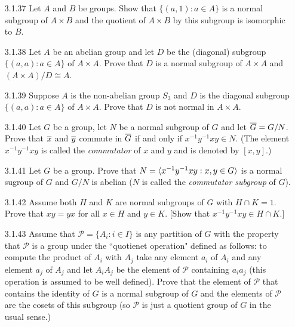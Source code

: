\begin{enumerate}
   \item[3.1.37]  Let $A$ and $B$ be groups. Show that $\{(a, 1) : a \in A\}$ is
                  a normal subgroup of $A \times B$ and the quotient of
                  $A \times B$ by this subgroup is isomorphic to $B$.
   \item[3.1.38]  Let $A$ be an abelian group and let $D$ be the (diagonal)
                  subgroup $\{(a, a) : a \in A\}$ of $A \times A$. Prove that
                  $D$ is a normal subgroup of $A \times A$ and
                  $(A \times A)/D \cong A$.
   \item[3.1.39]  Suppose $A$ is the non-abelian group $S_3$ and $D$ is the
                  diagonal subgroup $\{(a, a) : a \in A\}$ of $A \times A$.
                  Prove that $D$ is not normal in $A \times A$.
   \item[3.1.40]  Let $G$ be a group, let $N$ be a normal subgroup of $G$ and
                  let $\overline{G} = G/N$. Prove that $\overline{x}$ and $\overline{y}$ commute in
                  $\overline{G}$ if and only if $x^{-1}y^{-1}xy \in N$. (The element
                  $x^{-1}y^{-1}xy$ is called the \textit{commutator} of $x$ and
                  $y$ and is denoted by $[x, y]$.)
   \item[3.1.41]  Let $G$ be a group. Prove that
                  $N = \langle x^{-1}y^{-1}xy : x, y \in G \rangle$ is a normal sugroup of
                  $G$ and $G/N$ is abelian ($N$ is called the
                  \textit{commutator subgroup} of $G$).
   \item[3.1.42]  Assume both $H$ and $K$ are normal subgroups of $G$ with
                  $H \cap K = 1$. Prove that $xy = yx$ for all $x \in H$ and
                  $y \in K$. [Show that $x^{-1}y^{-1}xy \in H \cap K$.]
   \item[3.1.43]  Assume that $\mathcal{P} = \{A_i : i \in I\}$ is any partition
                  of $G$ with the property that $\mathcal{P}$ is a group under
                  the ``quotienet operation" defined as follows: to compute the
                  product of $A_i$ with $A_j$ take any element $a_i$ of $A_i$
                  and any element $a_j$ of $A_j$ and let $A_iA_j$ be the element
                  of $\mathcal{P}$ containing $a_ia_j$ (this operation is
                  assumed to be well defined). Prove that the element of
                  $\mathcal{P}$ that contains the identity of $G$ is a normal
                  subgroup of $G$ and the elements of $\mathcal{P}$ are the
                  cosets of this subgroup (so $\mathcal{P}$ is just a quotient
                  group of $G$ in the usual sense.)
\end{enumerate}
